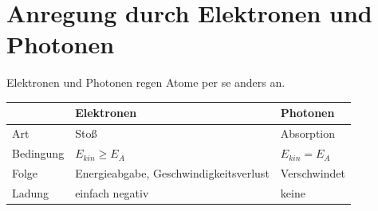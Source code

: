 \documentclass{article}
\begin{document}
\section{Anregung durch Elektronen und Photonen}
Elektronen und Photonen regen Atome per se anders an.
\begin{center}
\begin{tabular}{lll}
 & Elektronen & Photonen \\
 \midrule 
 Art & Stoß & Absorption \\ 
 Bedingung & $E_{kin} \ge E_A$ & $E_{kin} = E_A$ \\ 
 Folge & Energieabgabe, Geschwindigkeitsverlust & Verschwindet \\
 Ladung & einfach negativ & keine 
\end{tabular} 
\end{center} 
\end{document}
